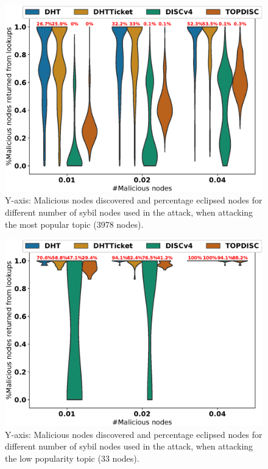 \begin{figure}[!h]
\includegraphics[width=\linewidth]{results/security/violin_percentEvil_percentageMaliciousDiscovered_t0.eps}
\caption{Y-axis: Malicious nodes discovered and percentage eclipsed nodes for different number of sybil nodes used in the attack,  when attacking the most popular topic (3978 nodes).}
\label{fig:eclipse_evil_t0}
\end{figure}

\begin{figure}[!h]
\includegraphics[width=\linewidth]{results/security/violin_percentEvil_percentageMaliciousDiscovered_t299.eps}
\caption{Y-axis: Malicious nodes discovered and percentage eclipsed nodes for different number of sybil nodes used in the attack,  when attacking the low popularity topic (33 nodes).}
\label{fig:eclipse_evil_t299}
\end{figure}


